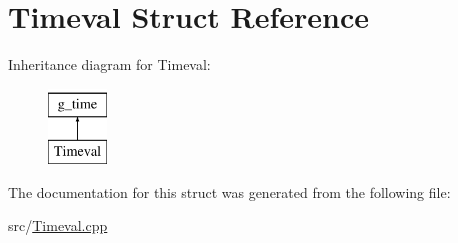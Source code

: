 \hypertarget{structTimeval}{}\section{Timeval Struct Reference}
\label{structTimeval}
Inheritance diagram for Timeval\+:\begin{figure}[H]
\begin{center}
\leavevmode
\includegraphics[height=2.000000cm]{structTimeval}
\end{center}
\end{figure}


The documentation for this struct was generated from the following file\+:\begin{DoxyCompactItemize}
\item 
src/\hyperlink{Timeval_8cpp}{Timeval.\+cpp}\end{DoxyCompactItemize}
